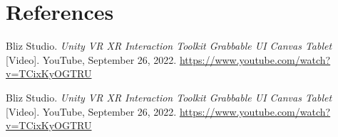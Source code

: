 \documentclass[12pt]{article}
\begin{document}
\section{References}
\begin{thebibliography}{9}
    Bliz Studio.  
    \textit{Unity VR XR Interaction Toolkit Grabbable UI Canvas Tablet} [Video].  
    YouTube, September 26, 2022.  
    \url{https://www.youtube.com/watch?v=TCixKyOGTRU}
    
    Bliz Studio.  
    \textit{Unity VR XR Interaction Toolkit Grabbable UI Canvas Tablet} [Video].  
    YouTube, September 26, 2022.  
    \url{https://www.youtube.com/watch?v=TCixKyOGTRU}

    \end{thebibliography}
\end{document}
